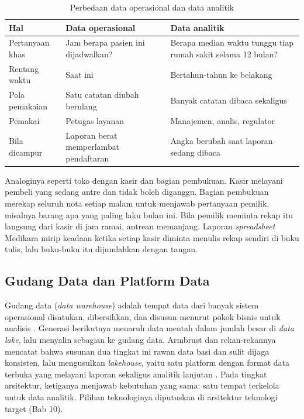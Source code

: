 \begin{table}[!htb]
  \centering
  \caption{Perbedaan data operasional dan data analitik}
  \label{tab:ch09-operasional-analitik}
  \small
  \begin{tabularx}{\textwidth}{lXX}
    \hline
    \textbf{Hal} & \textbf{Data operasional} & \textbf{Data analitik} \\
    \hline
    Pertanyaan khas & Jam berapa pasien ini dijadwalkan? & Berapa median waktu tunggu tiap rumah sakit selama 12 bulan? \\
    \hline
    Rentang waktu & Saat ini & Bertahun-tahun ke belakang \\
    \hline
    Pola pemakaian & Satu catatan diubah berulang & Banyak catatan dibaca sekaligus \\
    \hline
    Pemakai & Petugas layanan & Manajemen, analis, regulator \\
    \hline
    Bila dicampur & Laporan berat memperlambat pendaftaran & Angka berubah saat laporan sedang dibaca \\
    \hline
  \end{tabularx}
\end{table}

Analoginya seperti toko dengan kasir dan bagian pembukuan. Kasir melayani
pembeli yang sedang antre dan tidak boleh diganggu. Bagian pembukuan merekap
seluruh nota setiap malam untuk menjawab pertanyaan pemilik, misalnya barang
apa yang paling laku bulan ini. Bila pemilik meminta rekap itu langsung dari
kasir di jam ramai, antrean memanjang. Laporan \textit{spreadsheet} Medikara mirip
keadaan ketika setiap kasir diminta menulis rekap sendiri di buku tulis, lalu
buku-buku itu dijumlahkan dengan tangan.

\subsection*{Gudang Data dan Platform Data}

Gudang data (\textit{data warehouse}) adalah tempat data dari banyak sistem
operasional disatukan, dibersihkan, dan disusun menurut pokok bisnis untuk
analisis \cite{c09-kimball2013}. Generasi berikutnya menaruh data mentah dalam
jumlah besar di \textit{data lake}, lalu menyalin sebagian ke gudang data.
Armbrust dan rekan-rekannya mencatat bahwa susunan dua tingkat ini rawan data
basi dan sulit dijaga konsisten, lalu mengusulkan \textit{lakehouse}, yaitu
satu platform dengan format data terbuka yang melayani laporan sekaligus
analitik lanjutan \cite{c09-armbrust2021}. Pada tingkat arsitektur, ketiganya
menjawab kebutuhan yang sama: satu tempat terkelola untuk data analitik.
Pilihan teknologinya diputuskan di arsitektur teknologi target (Bab 10).

